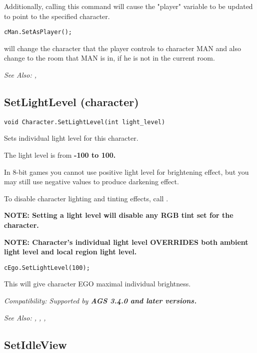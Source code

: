 Additionally, calling this command will cause the "player" variable to be
updated to point to the specified character.

\begin{verbatim}
cMan.SetAsPlayer();
\end{verbatim}
will change the character that the player controls to character MAN and also change to the room
that MAN is in, if he is not in the current room.

\it{See Also:} ,


\subsection{SetLightLevel (character)}\label{Character.SetLightLevel}%

\begin{verbatim}
void Character.SetLightLevel(int light_level)
\end{verbatim}
Sets individual light level for this character.

The light level is from \bf{-100 to 100}.

In 8-bit games you cannot use positive light level for brightening effect, but you
may still use negative values to produce darkening effect.

To disable character lighting and tinting effects, call .

\bf{NOTE}: Setting a light level will disable any RGB tint set for the character.

\bf{NOTE:} Character's individual light level OVERRIDES both ambient light level and local region light level.

\begin{verbatim}
cEgo.SetLightLevel(100);
\end{verbatim}
This will give character EGO maximal individual brightness.

\it{Compatibility:} Supported by \bf{AGS 3.4.0} and later versions.

\it{See Also:} ,
,
,


\subsection{SetIdleView}\label{Character.SetIdleView}%

